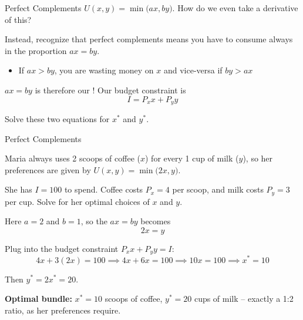 \documentclass{beamer}
\begin{document}
\begin{frame}{Perfect Complements}
  $U(x,y) = \min\big( ax, by \big)$. How do we even take a derivative of this?

  \bigskip
  Instead, recognize that perfect complements means you have to consume always in the proportion $ax = by$. 
  \begin{itemize}
    \item If $ax > by$, you are wasting money on $x$ and vice-versa if $by > ax$
  \end{itemize}

  \bigskip
  $ax = by$ is therefore our ! Our budget constraint is 
  $$
    I = P_x x + P_y y
  $$

  \bigskip
  Solve these two equations for $x^*$ and $y^*$.
\end{frame}
\begin{frame}{Perfect Complements}

  \bigskip
  Maria always uses 2 scoops of coffee ($x$) for every 1 cup of milk ($y$), so her preferences are given by $U(x,y) = \min\big(2x, y\big)$.

  \bigskip
  She has $I = 100$ to spend. Coffee costs $P_x = 4$ per scoop, and milk costs $P_y = 3$ per cup. Solve for her optimal choices of $x$ and $y$.
\end{frame}

\begin{frame}

  \bigskip
  Here $a = 2$ and $b = 1$, so the  $ax = by$ becomes
  $$
    2x = y
  $$

  \bigskip
  Plug into the budget constraint $P_x x + P_y y = I$:
  $$
    4x + 3(2x) = 100 \implies 4x + 6x = 100 \implies 10x = 100 \implies x^* = 10
  $$

  \bigskip
  Then $y^* = 2x^* = 20$.

  \bigskip
  \textbf{Optimal bundle:} $x^* = 10$ scoops of coffee, $y^* = 20$ cups of milk -- exactly a 1:2 ratio, as her preferences require.
\end{frame}
\end{document}
